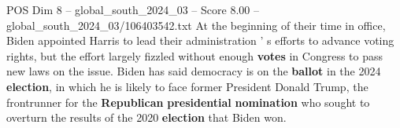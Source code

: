 \begin{textsample}{POS Dim 8 – global\_south\_2024\_03 – Score 8.00 – global\_south\_2024\_03/106403542.txt}
At the beginning of their time in office, Biden appointed Harris to lead their administration ' s efforts to advance voting rights, but the effort largely fizzled without enough \textbf{votes} in Congress to pass new laws on the issue.
Biden has said democracy is on the \textbf{ballot} in the 2024 \textbf{election}, in which he is likely to face former President Donald Trump, the frontrunner for the \textbf{Republican} \textbf{presidential} \textbf{nomination} who sought to overturn the results of the 2020 \textbf{election} that Biden won.

\end{textsample}
